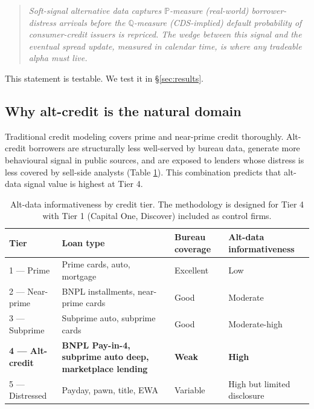 \documentclass[11pt,a4paper]{article}
\begin{document}
\begin{quote}\itshape
Soft-signal alternative data captures $\mathbb{P}$-measure (real-world) borrower-distress arrivals before the $\mathbb{Q}$-measure (CDS-implied) default probability of consumer-credit issuers is repriced. The wedge between this signal and the eventual spread update, measured in calendar time, is where any tradeable alpha must live.
\end{quote}

This statement is testable. We test it in §\ref{sec:results}.

\subsection{Why alt-credit is the natural domain}

Traditional credit modeling covers prime and near-prime credit thoroughly. Alt-credit borrowers are structurally less well-served by bureau data, generate more behavioural signal in public sources, and are exposed to lenders whose distress is less covered by sell-side analysts (Table \ref{tab:tier}). This combination predicts that alt-data signal value is highest at Tier 4.

\begin{table}[h]
\centering\small
\begin{tabular}{@{}p{2cm}p{5cm}p{2.5cm}p{2.8cm}@{}}
\toprule
\textbf{Tier} & \textbf{Loan type} & \textbf{Bureau coverage} & \textbf{Alt-data informativeness} \\
\midrule
1 — Prime          & Prime cards, auto, mortgage & Excellent & Low \\
2 — Near-prime     & BNPL installments, near-prime cards & Good & Moderate \\
3 — Subprime       & Subprime auto, subprime cards & Good & Moderate-high \\
\textbf{4 — Alt-credit} & \textbf{BNPL Pay-in-4, subprime auto deep, marketplace lending} & \textbf{Weak} & \textbf{High} \\
5 — Distressed     & Payday, pawn, title, EWA & Variable & High but limited disclosure \\
\bottomrule
\end{tabular}
\caption{Alt-data informativeness by credit tier. The methodology is designed for Tier 4 with Tier 1 (Capital One, Discover) included as control firms.}\label{tab:tier}
\end{table}

\end{document}
